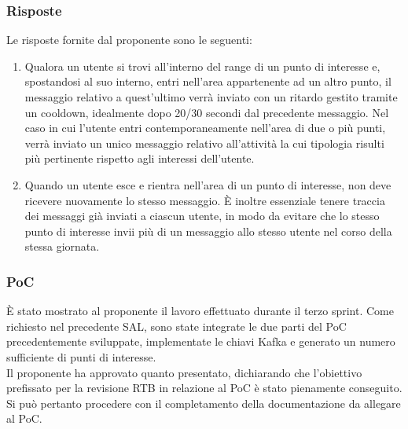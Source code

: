 \documentclass[10pt]{article}
\begin{document}
    \subsubsection{Risposte}
    Le risposte fornite dal proponente sono le seguenti:
    \begin{enumerate}
        \item Qualora un utente si trovi all'interno del range di un punto di interesse e, spostandosi al suo interno, entri nell'area appartenente ad un altro punto, il messaggio relativo a quest'ultimo verrà inviato con un ritardo gestito tramite un cooldown, idealmente dopo 20/30 secondi dal precedente messaggio. Nel caso in cui l'utente entri contemporaneamente nell'area di due o più punti, verrà inviato un unico messaggio relativo all'attività la cui tipologia risulti più pertinente rispetto agli interessi dell'utente.
        \item Quando un utente esce e rientra nell'area di un punto di interesse, non deve ricevere nuovamente lo stesso messaggio. È inoltre essenziale tenere traccia dei messaggi già inviati a ciascun utente, in modo da evitare che lo stesso punto di interesse invii più di un messaggio allo stesso utente nel corso della stessa giornata.
    \end{enumerate}

    \subsubsection{PoC}
    È stato mostrato al proponente il lavoro effettuato durante il terzo sprint. Come richiesto nel precedente SAL, sono state integrate le due parti del PoC precedentemente sviluppate, implementate le chiavi Kafka e generato un numero sufficiente di punti di interesse.\\
    Il proponente ha approvato quanto presentato, dichiarando che l'obiettivo prefissato per la revisione RTB in relazione al PoC è stato pienamente conseguito. Si può pertanto procedere con il completamento della documentazione da allegare al PoC.
\end{document}
